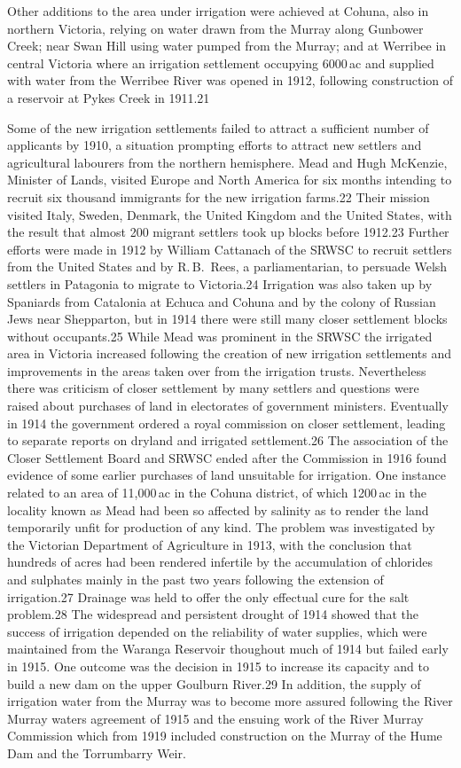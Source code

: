 Other additions to the area under irrigation were achieved at Cohuna,
also in northern Victoria, relying on water drawn from the Murray
along Gunbower Creek; near Swan Hill using water pumped from the
Murray; and at Werribee in central Victoria where an irrigation
settlement occupying 6000\,ac and supplied with water from the Werribee
River was opened in 1912, following construction of a reservoir at
Pykes Creek in 1911.21

Some of the new irrigation settlements failed to attract a sufficient
number of applicants by 1910, a situation prompting efforts to attract
new settlers and agricultural labourers from the northern hemisphere.
Mead and Hugh McKenzie, Minister of Lands, visited Europe and North
America for six months intending to recruit six thousand immigrants
for the new irrigation farms.22 Their mission visited Italy, Sweden,
Denmark, the United Kingdom and the United States, with the result
that almost 200 migrant settlers took up blocks before 1912.23 Further
efforts were made in 1912 by William Cattanach of the SRWSC to recruit
settlers from the United States and by R.\,B.~Rees, a parliamentarian,
to persuade Welsh settlers in Patagonia to migrate to Victoria.24
Irrigation was also taken up by Spaniards from Catalonia at Echuca and
Cohuna and by the colony of Russian Jews near Shepparton, but in 1914
there were still many closer settlement blocks without occupants.25
While Mead was prominent in the SRWSC the irrigated area in Victoria
increased following the creation of new irrigation settlements and
improvements in the areas taken over from the irrigation trusts.
Nevertheless there was criticism of closer settlement by many settlers
and questions were raised about purchases of land in electorates of
government ministers.  Eventually in 1914 the government ordered a
royal commission on closer settlement, leading to separate reports on
dryland and irrigated settlement.26 The association of the Closer
Settlement Board and SRWSC ended after the Commission in 1916 found
evidence of some earlier purchases of land unsuitable for irrigation.
One instance related to an area of 11,000\,ac in the Cohuna district,
of which 1200\,ac in the locality known as Mead had been so affected
by salinity as to render the land temporarily unfit for production of
any kind.  The problem was investigated by the Victorian Department of
Agriculture in 1913, with the conclusion that hundreds of acres had
been rendered infertile by the accumulation of chlorides and sulphates
mainly in the past two years following the extension of irrigation.27
Drainage was held to offer the only effectual cure for the salt
problem.28 The widespread and persistent drought of 1914 showed that
the success of irrigation depended on the reliability of water
supplies, which were maintained from the Waranga Reservoir thoughout
much of 1914 but failed early in 1915.  One outcome was the decision
in 1915 to increase its capacity and to build a new dam on the upper
Goulburn River.29 In addition, the supply of irrigation water from the
Murray was to become more assured following the River Murray waters
agreement of 1915 and the ensuing work of the River Murray Commission
which from 1919 included construction on the Murray of the Hume Dam
and the Torrumbarry Weir.

